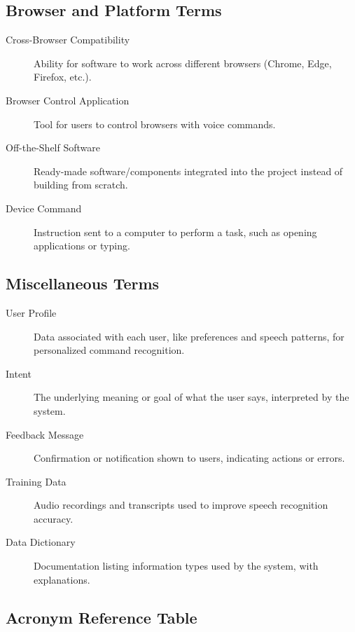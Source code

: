 \documentclass[11pt]{article}
\begin{document}
\subsection*{Browser and Platform Terms}

\begin{description}
  \item[Cross-Browser Compatibility] Ability for software to work across different browsers (Chrome, Edge, Firefox, etc.).
  \item[Browser Control Application] Tool for users to control browsers with voice commands.
  \item[Off-the-Shelf Software] Ready-made software/components integrated into the project instead of building from scratch.
  \item[Device Command] Instruction sent to a computer to perform a task, such as opening applications or typing.
\end{description}

\subsection*{Miscellaneous Terms}

\begin{description}
  \item[User Profile] Data associated with each user, like preferences and speech patterns, for personalized command recognition.
  \item[Intent] The underlying meaning or goal of what the user says, interpreted by the system.
  \item[Feedback Message] Confirmation or notification shown to users, indicating actions or errors.
  \item[Training Data] Audio recordings and transcripts used to improve speech recognition accuracy.
  \item[Data Dictionary] Documentation listing information types used by the system, with explanations.
\end{description}

\subsection*{Acronym  Reference Table}
\end{document}
